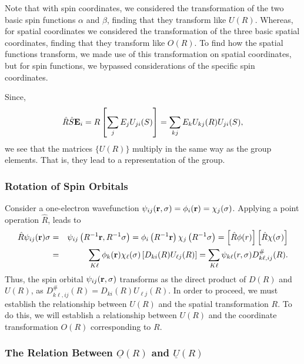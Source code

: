 Note that with spin coordinates, we considered the transformation of 
the two basic spin functions $\alpha$ and $\beta$, finding that they 
transform like $U(R)$.  Whereas, for spatial coordinates we considered 
the transformation of the three basic spatial coordinates, finding that 
they transform like $O(R)$.  To find how the spatial functions 
transform, we made use of this transformation on spatial coordinates, 
but for spin functions, we bypassed considerations of the specific 
spin coordinates.

Since,
\begin{equation}
{\hat{R}} {\hat{S}} {\bf E}_i = R \left[ \sum_j E_j 
U_{ji}(S)\right] = \sum_{kj} E_k U_{kj}(R)U_{ji}(S),
\end{equation}
we see that the matrices $\{ U(R)\}$ multiply in the same way as the 
group elements.  That is, they lead to a representation of the group.

\subsubsection{Rotation of Spin Orbitals}

Consider a one-electron wavefunction $\psi_{ij}({\bf r} , \sigma ) = 
\phi_i ( {\bf r} ) = \chi_j(\sigma)$.  Applying a point operation 
${\hat{R}}$, leads to
\begin{eqnarray}
{\hat{R}} \psi_{ij} ( {\bf r} ) \sigma &=& \psi_{ij} \left( R^{-1} 
{\bf r} , R^{-1} \sigma \right) = \phi_i \left( R^{-1} {\bf r} \right) 
\chi_j \left( R^{-1} \sigma \right)
= \left[ {\hat{R}} \phi(r) \right] \left[ {\hat{R}} \chi(\sigma) 
\right]\cr
&=& \sum_{K\ell} \phi_k ( {\bf r} ) \chi_{\ell} (\sigma) \left[ 
D_{ki}(R) U_{\ell j}(R) \right] = \sum_{K\ell} \psi_{k\ell} ( r , 
\sigma ) D^{\#}_{k\ell ,ij} (R).
\end{eqnarray}
Thus, the spin orbital $\psi_{ij}({\bf r} , \sigma)$ transforms as the 
direct product of $D(R)$ and $U(R)$, as $D^{\#}_{k\ell ,ij}(R) = 
D_{ki}(R)U_{\ell j}(R)$.  In order to proceed, we must establish the 
relationship between $U(R)$ and the spatial transformation $R$.  To 
do this, we will establish a relationship between $U(R)$ and the 
coordinate transformation $O(R)$ corresponding to $R$.

\subsubsection{The Relation Between $\underline{O}(R)$ 
and $\underline{U}(R)$}


